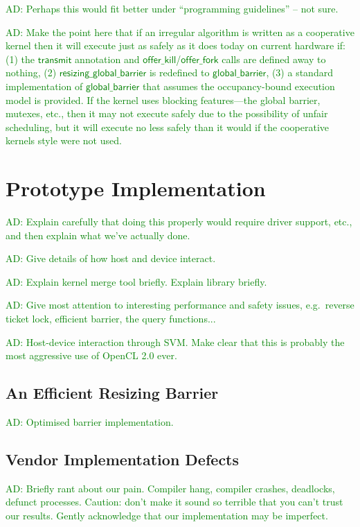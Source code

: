\documentclass[nocopyrightspace,10pt]{sigplanconf}
\newcommand{\ADComment}[1]{\textcolor{green}{AD: #1}}
\newcommand{\transmit}{\mathsf{transmit}}
\newcommand{\offerfork}{\mathsf{offer\_fork}}
\newcommand{\offerkill}{\mathsf{offer\_kill}}
\newcommand{\globalbarrier}{\mathsf{global\_barrier}}
\newcommand{\resizingglobalbarrier}{\mathsf{resizing\_global\_barrier}}
\begin{document}
\ADComment{Perhaps this would fit better under ``programming guidelines'' -- not sure.}

\ADComment{Make the point here that if an irregular algorithm is
  written as a cooperative kernel then it will execute just as safely
  as it does today on current hardware if: (1) the $\transmit$
  annotation and $\offerkill$/$\offerfork$ calls are defined away to
  nothing, (2) $\resizingglobalbarrier$ is redefined to
  $\globalbarrier$, (3) a standard implementation of $\globalbarrier$
  that assumes the occupancy-bound execution model is provided.  If the kernel uses blocking features---the global barrier, mutexes, etc., then it may not execute safely due to the possibility of unfair scheduling, but it will execute no less safely than it would if the cooperative kernels style were not used.}


\section{Prototype Implementation}\label{sec:implementation}

\ADComment{Explain carefully that doing this properly would require
  driver support, etc., and then explain what we've actually done.}

\ADComment{Give details of how host and device interact.}

\ADComment{Explain kernel merge tool briefly.  Explain library briefly.}

\ADComment{Give most attention to interesting performance and safety issues, e.g.\ reverse ticket lock, efficient barrier, the query functions...}

\ADComment{Host-device interaction through SVM.  Make clear that this is probably the most aggressive use of OpenCL 2.0 ever.}

\subsection{An Efficient Resizing Barrier}\label{sec:resizingbarrier}

\ADComment{Optimised barrier implementation.}

\subsection{Vendor Implementation Defects}

\ADComment{Briefly rant about our pain.  Compiler hang, compiler crashes, deadlocks, defunct processes.  Caution: don't make it sound so terrible that you can't trust our results.  Gently acknowledge that our implementation may be imperfect.}
\end{document}
